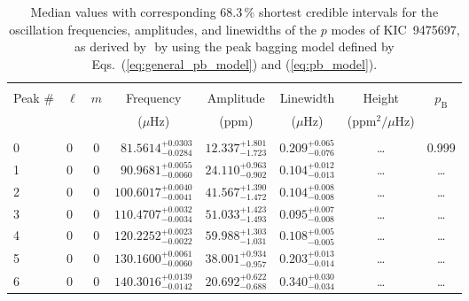 \begin{table*}[!]
\caption{Median values with corresponding 68.3\,\% shortest credible intervals for the oscillation frequencies, amplitudes, and linewidths of the $p$ modes of KIC~9475697, as derived by \diamonds\,\,by using the peak bagging model defined by Eqs.~(\ref{eq:general_pb_model}) and (\ref{eq:pb_model}).}
\label{tab:9475697p}
\centering
\begin{tabular}{llcrrlrc}
\hline\hline
\\[-8pt]
Peak \# & $\ell$ & $m$ & \multicolumn{1}{c}{Frequency} & \multicolumn{1}{c}{Amplitude} & \multicolumn{1}{c}{Linewidth} & \multicolumn{1}{c}{Height}& $p_\mathrm{B}$\\
 & & & \multicolumn{1}{c}{($\mu$Hz)} & \multicolumn{1}{c}{(ppm)} & \multicolumn{1}{c}{($\mu$Hz)} & \multicolumn{1}{c}{(ppm$^2/\mu$Hz)}\\
\hline \\[-8pt]
0 & 0 & 0 & $     81.5614_{-      0.0284}^{+      0.0303}$ & $      12.337_{-       1.723}^{+       1.801}$ & $       0.209_{-       0.076}^{+       0.065}$ & \multicolumn{1}{c}{\dots} & 0.999\\[1pt]
1 & 0 & 0 & $     90.9681_{-      0.0060}^{+      0.0055}$ & $      24.110_{-       0.902}^{+       0.963}$ & $       0.104_{-       0.013}^{+       0.012}$ & \multicolumn{1}{c}{\dots} & \dots \\[1pt]
2 & 0 & 0 & $    100.6017_{-      0.0041}^{+      0.0040}$ & $      41.567_{-       1.472}^{+       1.390}$ & $       0.104_{-       0.008}^{+       0.008}$ & \multicolumn{1}{c}{\dots} & \dots \\[1pt]
3 & 0 & 0 & $    110.4707_{-      0.0034}^{+      0.0032}$ & $      51.033_{-       1.493}^{+       1.423}$ & $       0.095_{-       0.008}^{+       0.007}$ & \multicolumn{1}{c}{\dots} & \dots \\[1pt]
4 & 0 & 0 & $    120.2252_{-      0.0022}^{+      0.0023}$ & $      59.988_{-       1.031}^{+       1.303}$ & $       0.108_{-       0.005}^{+       0.005}$ & \multicolumn{1}{c}{\dots} & \dots \\[1pt]
5 & 0 & 0 & $    130.1600_{-      0.0060}^{+      0.0061}$ & $      38.001_{-       0.957}^{+       0.934}$ & $       0.203_{-       0.014}^{+       0.013}$ & \multicolumn{1}{c}{\dots} & \dots \\[1pt]
6 & 0 & 0 & $    140.3016_{-      0.0142}^{+      0.0139}$ & $      20.692_{-       0.688}^{+       0.622}$ & $       0.340_{-       0.034}^{+       0.030}$ & \multicolumn{1}{c}{\dots} & \dots \\[1pt]

\end{tabular}
\end{table*}
